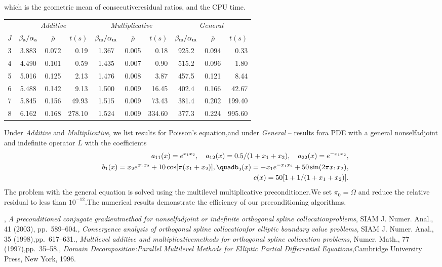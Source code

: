 \documentclass{report}
\begin{document}
which is the geometric mean of consecutiveresidual ratios,
and the CPU time.\begin{center}\begin{tabular}{c|ccr|ccr|ccr}
& \multicolumn{3}{c|}{\textit{Additive}}
& \multicolumn{3}{c|}{\textit{Multiplicative}}&\multicolumn{3}{c}{\textit{General}}\\\cline{2-10}$J$
& $\beta_{\textrm{\scriptsize a}}/\alpha_{\textrm{\scriptsize a}}$
& $\bar{\rho}$
& $t(s)$
& $\beta_{\textrm{\scriptsize m}}/\alpha_{\textrm{\scriptsize m}}$
& $\bar{\rho}$
& $t(s)$
& $\beta_{\textrm{\scriptsize m}}/\alpha_{\textrm{\scriptsize m}}$
& $\bar{\rho}$
& $t(s)$\\\hline3
& 3.883
& 0.072
& 0.19
& 1.367
& 0.005
& 0.18
& 925.2
& 0.094
& 0.33\\4
& 4.490
& 0.101
& 0.59
& 1.435
& 0.007
& 0.90
& 515.2
& 0.096
& 1.80\\5
& 5.016
& 0.125
& 2.13
& 1.476
& 0.008
& 3.87
& 457.5
& 0.121
& 8.44\\6
& 5.488
& 0.142
& 9.13
& 1.500
& 0.009
& 16.45
& 402.4
& 0.166
& 42.67\\7
& 5.845
& 0.156
& 49.93
& 1.515
& 0.009
& 73.43
& 381.4
& 0.202
& 199.40\\8
& 6.162
& 0.168
& 278.10
& 1.524
& 0.009
& 334.60
& 377.3
& 0.224
& 995.60\end{tabular}\end{center}Under \textit{Additive} and \textit{Multiplicative},
we list results for Poisson's equation,and under \textit{General} -- results fora PDE with a general nonselfadjoint and indefinite operator $L$ with the coefficients\begin{eqnarray*}&&a_{11}(x)=e^{x_1x_2},\quad a_{12}(x)=0.5/(1+x_{1}+x_{2}),\quad a_{22}(x)=e^{-x_1x_2},\\&&b_{1}(x)=x_2e^{x_1x_2}+10\cos[\pi(x_1+x_2)],\quadb_{2}(x)=-x_1 e^{-x_1x_2}+50\sin (2\pi x_1x_2),\\&&c(x)=50[1+1/(1+x_1+x_2)].\end{eqnarray*}The problem with the general equation is solved using the multilevel multiplicative preconditioner.We set $\pi_0=\Omega$ and reduce the relative residual to less than $10^{-12}$.The numerical results demonstrate the efficiency of our preconditioning algorithms.\begin{thebibliography}{1},
{\em A preconditioned conjugate gradientmethod for nonselfadjoint or indefinite orthogonal spline collocationproblems},
SIAM J.
Numer.
Anal.,
41 (2003),
pp.~589--604.,
{\em Convergence analysis of orthogonal spline collocationfor elliptic boundary value problems},
SIAM J.
Numer.
Anal.,
35 (1998),pp.~617--631.,
{\em Multilevel additive and multiplicativemethods for orthogonal spline collocation problems},
Numer.
Math.,
77 (1997),pp.~35--58.,
{\em Domain Decomposition:Parallel Multilevel Methods for Elliptic Partial Differential Equations},Cambridge University Press,
New York,
1996.\end{thebibliography}
\end{document}
